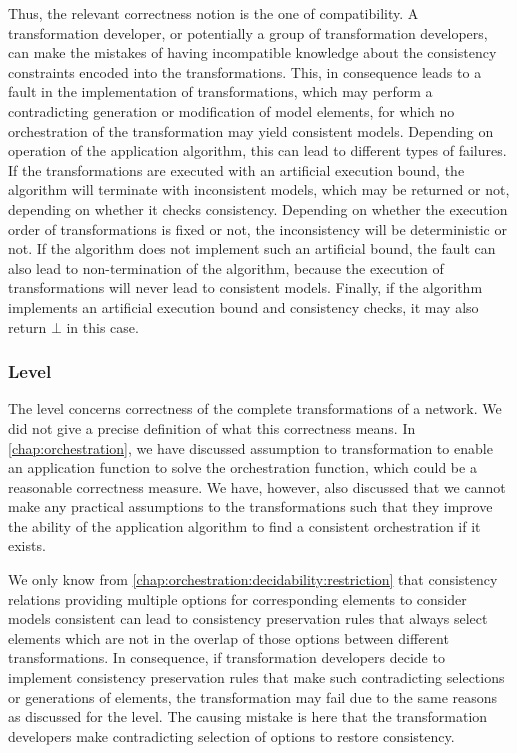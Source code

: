 Thus, the relevant correctness notion is the one of compatibility.
A transformation developer, or potentially a group of transformation developers, can make the mistakes of having incompatible knowledge about the consistency constraints encoded into the transformations.
This, in consequence leads to a fault in the implementation of transformations, which may perform a contradicting generation or modification of model elements, for which no orchestration of the transformation may yield consistent models.
Depending on operation of the application algorithm, this can lead to different types of failures.
If the transformations are executed with an artificial execution bound, the algorithm will terminate with inconsistent models, which may be returned or not, depending on whether it checks consistency.
Depending on whether the execution order of transformations is fixed or not, the inconsistency will be deterministic or not.
If the algorithm does not implement such an artificial bound, the fault can also lead to non-termination of the algorithm, because the execution of transformations will never lead to consistent models.
Finally, if the algorithm implements an artificial execution bound and consistency checks, it may also return $\bot$ in this case.

\subsubsection*{\LevelNetworkRule Level}

The \levelnetworkrule level concerns correctness of the complete transformations of a network.
We did not give a precise definition of what this correctness means.
In \autoref{chap:orchestration}, we have discussed assumption to transformation to enable an application function to solve the orchestration function, which could be a reasonable correctness measure.
We have, however, also discussed that we cannot make any practical assumptions to the transformations such that they improve the ability of the application algorithm to find a consistent orchestration if it exists.

We only know from \autoref{chap:orchestration:decidability:restriction} that consistency relations providing multiple options for corresponding elements to consider models consistent can lead to consistency preservation rules that always select elements which are not in the overlap of those options between different transformations.
In consequence, if transformation developers decide to implement consistency preservation rules that make such contradicting selections or generations of elements, the transformation may fail due to the same reasons as discussed for the \levelnetworkrelation level.
The causing mistake is here that the transformation developers make contradicting selection of options to restore consistency.

